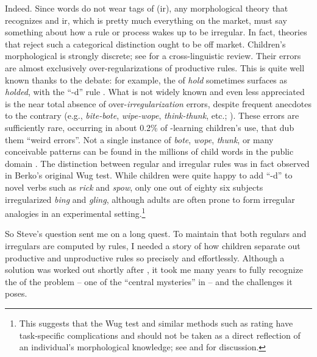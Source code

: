 \documentclass[output=paper,
modfonts
]{LSP/langsci}
\begin{document}
Indeed. Since words do not wear tags of (ir), any
morphological theory that recognizes  and ir,
which is pretty much everything on the
market, must say something about how a rule or process wakes up to be
irregular. In fact, 
theories that reject  such a categorical distinction
\citep[e.g.,][]{Hay2003, McClelland2002}  ought to be off
market. Children's morphological  is strongly discrete; see
\citealt[][Chapter 2]{POP}  for a cross-linguistic review. Their errors
are almost exclusively over-regularizations of productive rules. This
is quite well known thanks to the  debate: for example, the
 of \textit{hold}  sometimes surfaces as \textit{holded}, with the ``-d'' rule
\citep{Marcus1992}.   What is not widely known and even
less appreciated is the near total absence of over-\textit{irregularization} errors, despite frequent anecdotes to the
contrary (e.g., \textit{bite-bote}, \textit{wipe-wope}, \textit{think-thunk},
etc.; \citealt{Bowerman1982, Bybee1985, Pinker1999}). These errors
are sufficiently rare, occurring in  about 0.2\% of -learning children's
 use,  that \citet{Xu1995} dub them ``weird 
errors''. Not  a single instance of \textit{bote},
\textit{wope}, \textit{thunk}, or many conceivable  patterns
can be found in the millions of child  words in the public
domain \citep{CHILDES}. The distinction between regular and irregular
rules was in fact observed in Berko's \citeyearpar{Berko1958} original Wug test. While  children 
were quite happy to add ``-d'' to novel verbs such as \textit{rick} and
\textit{spow}, only one out of eighty six subjects irregularized \textit{bing} and
\textit{gling}, although adults are often prone to form irregular
analogies in an experimental setting.\footnote{This suggests
  that the Wug test and similar methods such as rating have
 task-specific complications and should not be taken as a direct
 reflection of an   individual's morphological knowledge; see
 \citealt{Schutze2005} and \citealt{POP} for   discussion.}  

So  Steve's question sent me on
a long quest. To maintain that both regulars and irregulars are
computed by rules, I needed a story of how children separate out productive
and  unproductive rules so precisely and effortlessly.
Although a solution was worked 
out shortly after \citep{Yang2002}, it took me many years 
 to fully recognize the  of the  problem -- one
of the ``central mysteries'' in 
\citep[35]{Aronoff1976} -- and the challenges it poses. 
\end{document}
